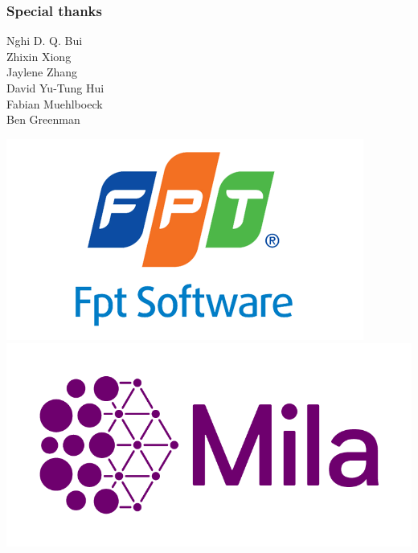 \documentclass{beamer}
\begin{document}
    \begin{frame}
        \frametitle{Special thanks}
            \begin{center}
                \LARGE{
                    Nghi D. Q. Bui\\
                    Zhixin Xiong\\
                    Jaylene Zhang\\
                    David Yu-Tung Hui\\
                    Fabian Muehlboeck\\
                    Ben Greenman
                }

                \includegraphics[scale=0.3]{../figures/fpt_logo.png}
                \includegraphics[scale=0.2]{../figures/mila_logo.png}
            \end{center}
    \end{frame}
\end{document}
